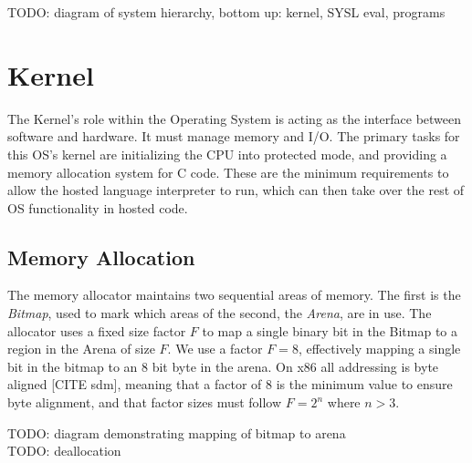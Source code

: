 \documentclass[11pt]{report}
\begin{document}
TODO: diagram of system hierarchy, bottom up: kernel, SYSL eval, programs


\section{Kernel}
The Kernel's role within the Operating System is acting as the interface between software and hardware. It must manage memory and I/O. The primary tasks for this OS's kernel are initializing the CPU into protected mode, and providing a memory allocation system for C code. These are the minimum requirements to allow the hosted language interpreter to run, which can then take over the rest of OS functionality in hosted code.

\subsection{Memory Allocation}
The memory allocator maintains two sequential areas of memory. The first is the \textit{Bitmap}, used to mark which areas of the second, the \textit{Arena}, are in use. The allocator uses a fixed size factor $F$ to map a single binary bit in the Bitmap to a region in the Arena of size $F$. We use a factor $F = 8$, effectively mapping a single bit in the bitmap to an 8 bit byte in the arena. On x86 all addressing is byte aligned [CITE sdm], meaning that a factor of 8 is the minimum value to ensure byte alignment, and that factor sizes must follow $F = 2^n$ where $n > 3 $.

TODO: diagram demonstrating mapping of bitmap to arena \\
TODO: deallocation
\end{document}
